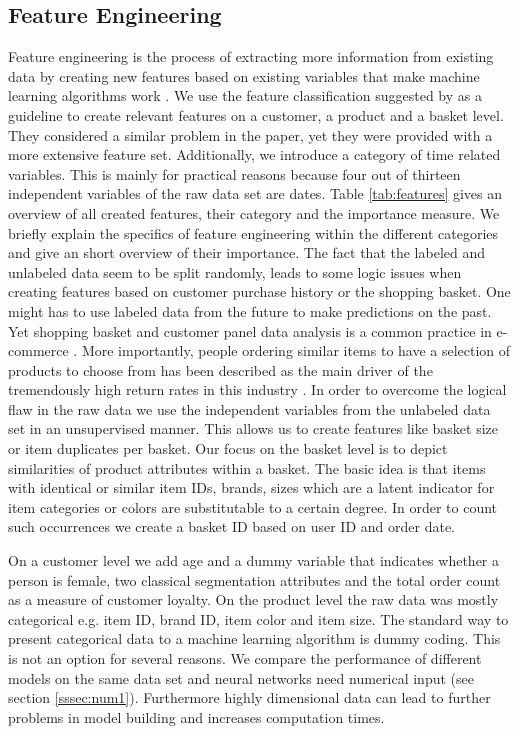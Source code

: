 \documentclass[12pt]{article}
\begin{document}
\subsection{Feature Engineering} \label{subsec:num2}
Feature engineering is the process of extracting more information from existing data by creating new features based on existing variables that make machine learning algorithms work \cite{WinNT3}. 
We use the feature classification suggested by \cite{urbanke2015predicting} 
as a guideline to create relevant features on a customer, a product and a basket level. They considered a similar problem in the paper, yet they were provided with a more extensive feature set. Additionally, we introduce a category of time related variables. This is mainly for practical reasons because four out of thirteen independent variables of the raw data set are dates. Table \ref{tab:features} gives an overview of all created features, their category and the importance measure.
We briefly explain the specifics of feature engineering within the different categories and give an short overview of their importance.
The fact that the labeled and unlabeled data seem to be split randomly, leads to some logic issues when creating features based on customer purchase history or the shopping basket. One might has to use labeled data from the future to make predictions on the past. Yet shopping basket and customer panel data analysis is a common practice in e-commerce \cite{lohse2000consumer}. More importantly, people ordering similar items to have a selection of products to choose from has been described as the main driver of the tremendously high return rates in this industry \cite{asdecker2015returning}. In order to overcome the logical flaw in the raw data we use the independent variables from the unlabeled data set in an unsupervised manner. This allows us to create features like basket size or item duplicates per basket. Our focus on the basket level is to depict similarities of product attributes within a basket. The basic idea is that items with identical or similar item IDs, brands, sizes which are a latent indicator for item categories or colors are substitutable to a certain degree. In order to count such occurrences we create a basket ID based on user ID and order date. 


On a customer level we add age and a dummy variable that indicates whether a person is female, two classical segmentation attributes \cite{anselmsson2006sources} and the total order count as a measure of customer loyalty. 
On the product level the raw data was mostly categorical e.g. item ID, brand ID, item color and item size. The standard way to present categorical data to a machine learning algorithm is dummy coding. This is not an option for several reasons. We compare the performance of different models on the same data set and neural networks need numerical input (see section \ref{sssec:num1}). Furthermore highly dimensional data can lead to further problems in model building and increases computation times. 
\end{document}
